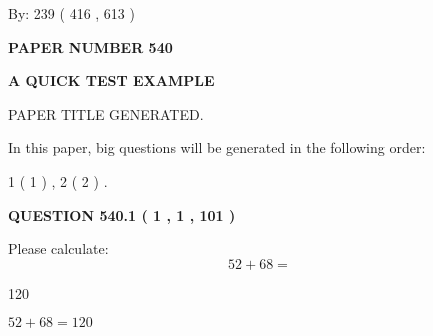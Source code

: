 \documentclass[12pt]{article}
\begin{document}
   
\hspace{1.0in} By: 
 239 ( 416 ,  613 )
   
   
   
   
\newpage 
\setcounter{page}{ 
   540001 } 
   
   
   
   
 {\textbf{ \Large{ PAPER NUMBER  540  }}}
   
   
\vspace{0.2in}
   
   
   
   
   
   
   
   
 \vspace{0.2in}
{\LARGE {\textbf{ A QUICK TEST EXAMPLE}}}
   
   
 PAPER TITLE GENERATED.
   
   
   
\vspace{0.2in}
   
In this paper, big questions will be generated in the following order: 
   
   
   1 ( 1 )
 ,
   2 ( 2 )
 .
  
\vspace{0.2in}
  
{\textbf{\Large{QUESTION
540.1 
 ( 1 , 1 , 101 )
}}}
  
  
 
Please calculate:
\begin{equation}
52 +  %
68 = \nonumber
\end{equation}
 
 
 
\noindent{}
 
 

120
 
 
\noindent{}
 
 

 
 
 
\noindent{}
 
 

$ %
52 +  %
68=   %
120$
 
 
\noindent{}
 
\end{document}
